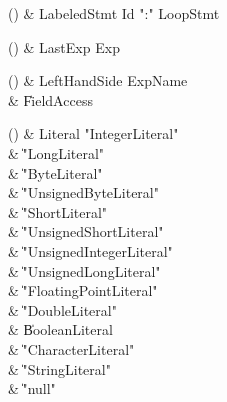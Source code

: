 \begin{bbgrammarappendix}

() & LabeledStmt \label{prod:LabeledStmt}  \: Id \xcd":" LoopStmt  \\


\end{bbgrammarappendix}

\begin{bbgrammarappendix}

() & LastExp \label{prod:LastExp}  \: Exp  \\


\end{bbgrammarappendix}

\begin{bbgrammarappendix}

() & LeftHandSide \label{prod:LeftHandSide}  \: ExpName  \\

 &    \| FieldAccess \\

\end{bbgrammarappendix}

\begin{bbgrammarappendix}

() & Literal \label{prod:Literal}  \: \xcd"IntegerLiteral"   \\

 &    \| \xcd"LongLiteral"  \\
 &    \| \xcd"ByteLiteral" \\
 &    \| \xcd"UnsignedByteLiteral" \\
 &    \| \xcd"ShortLiteral" \\
 &    \| \xcd"UnsignedShortLiteral" \\
 &    \| \xcd"UnsignedIntegerLiteral"  \\
 &    \| \xcd"UnsignedLongLiteral"  \\
 &    \| \xcd"FloatingPointLiteral"  \\
 &    \| \xcd"DoubleLiteral"  \\
 &    \| BooleanLiteral \\
 &    \| \xcd"CharacterLiteral"  \\
 &    \| \xcd"StringLiteral"  \\
 &    \| \xcd"null" \\

\end{bbgrammarappendix}

